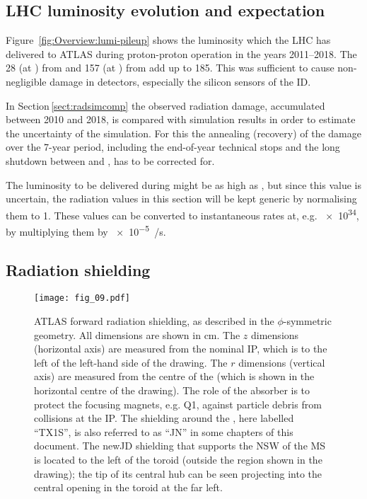\documentclass[cernpreprint, atlasdraft=false, UKenglish,british,orcidlogo, texmf, orcidlogo]{atlasdoc}
\begin{document}
 
\subsection{LHC luminosity evolution and expectation}
 
Figure~\ref{fig:Overview:lumi-pileup} shows the luminosity which the \gls{LHC} has delivered to ATLAS
during proton-proton operation in the years \numrange{2011}{2018}. The \SI{28}{\ifb} (at ) from \RunOne and \SI{157}{\ifb} (at )
from \RunTwo add up to \SI{185}{\ifb}. This was sufficient to cause non-negligible damage in
detectors, especially the silicon sensors of the \gls{ID}.
 
In Section\,\ref{sect:radsimcomp} the observed radiation damage, accumulated between 2010 and 2018, is compared with simulation results
in order to estimate the uncertainty of the simulation. For this the annealing (recovery) of the damage over
the 7-year period, including the end-of-year technical stops and the long shutdown between \RunOne and \RunTwo,
has to be corrected for.
 
The luminosity to be delivered during \RunThr might be as high as \intlumirunthree, but since this value
is uncertain, the radiation values in this section will be kept generic by normalising them to \SI{1}{\ifb}.
These values can be converted to instantaneous rates at, e.g. \SI{e34}{\instLumiUnit}, by multiplying them by
\SI{e-5}{\fb/\s}. 
 
 
 
\subsection{Radiation shielding}
\label{ss:RadShielding}
\begin{figure}
\begin{center}
\texttt{[image: fig\_09.pdf]}
\end{center}
\caption{ATLAS forward radiation shielding, as described in the $\phi$-symmetric \fluka geometry. All dimensions are shown in \si{\cm}. The $z$ dimensions (horizontal axis) are measured from the nominal \gls{IP}, which is to the left of the left-hand side of the drawing. The $r$ dimensions (vertical axis) are measured from the centre of the \beampipe (which is shown in the horizontal centre of the drawing). The role of the  absorber
is to protect the focusing magnets, e.g. Q1, against particle debris from collisions at the \gls{IP}. The shielding around the , here labelled ``TX1S'', is also referred to as ``JN'' in some chapters of this document. The \gls{newJD} shielding that supports the \gls{NSW} of the \gls{MS} is located to the left of the toroid (outside the region shown in the drawing); the tip of its central hub can be seen projecting into the central opening in the toroid at the far left. }
\label{fig:fw_shielding}
\end{figure}
 
\end{document}
